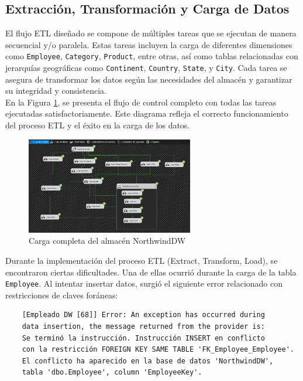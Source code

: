 \documentclass{article}
\begin{document}
\subsection{Extracción, Transformación y Carga de Datos}

El flujo ETL diseñado se compone de múltiples tareas que se ejecutan de manera secuencial y/o paralela. Estas tareas incluyen la carga de diferentes dimensiones como \texttt{Employee}, \texttt{Category}, \texttt{Product}, entre otras, así como tablas relacionadas con jerarquías geográficas como \texttt{Continent}, \texttt{Country}, \texttt{State}, y \texttt{City}. Cada tarea se asegura de transformar los datos según las necesidades del almacén y garantizar su integridad y consistencia.
\\

En la Figura \ref{fig:NorthWind}, se presenta el flujo de control completo con todas las tareas ejecutadas satisfactoriamente. Este diagrama refleja el correcto funcionamiento del proceso ETL y el éxito en la carga de los datos.

\begin{figure}[H]
	\begin{center} 
		\includegraphics[width=0.65\textwidth]{images/cargaNorthwind.png} %
		\caption{Carga completa del almacén NorthwindDW}
		\label{fig:NorthWind}
	\end{center}
\end{figure}

Durante la implementación del proceso ETL (Extract, Transform, Load), se encontraron ciertas dificultades. Una de ellas ocurrió durante la carga de la tabla \texttt{Employee}. Al intentar insertar datos, surgió el siguiente error relacionado con restricciones de claves foráneas:

\begin{verbatim}
	[Empleado DW [68]] Error: An exception has occurred during 
	data insertion, the message returned from the provider is: 
	Se terminó la instrucción. Instrucción INSERT en conflicto 
	con la restricción FOREIGN KEY SAME TABLE 'FK_Employee_Employee'. 
	El conflicto ha aparecido en la base de datos 'NorthwindDW', 
	tabla 'dbo.Employee', column 'EmployeeKey'.
\end{verbatim}
\end{document}
